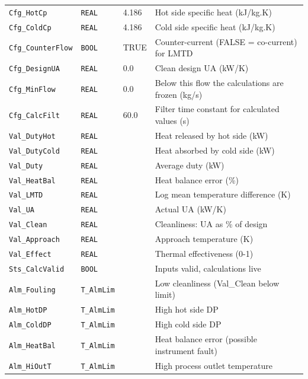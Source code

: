 \begin{small}
\begin{longtable}{@{}P{3.70cm}P{2.20cm}P{1.70cm}P{8.91cm}@{}}
\texttt{Cfg\_HotCp} & \texttt{REAL} & 4.186 & Hot side specific heat (kJ/\allowbreak{}kg.K) \\
\texttt{Cfg\_ColdCp} & \texttt{REAL} & 4.186 & Cold side specific heat (kJ/\allowbreak{}kg.K) \\
\texttt{Cfg\_CounterFlow} & \texttt{BOOL} & TRUE & Counter-current (FALSE = co-current) for LMTD \\
\texttt{Cfg\_DesignUA} & \texttt{REAL} & 0.0 & Clean design UA (kW/\allowbreak{}K) \\
\texttt{Cfg\_MinFlow} & \texttt{REAL} & 0.0 & Below this flow the calculations are frozen (kg/\allowbreak{}s) \\
\texttt{Cfg\_CalcFilt} & \texttt{REAL} & 60.0 & Filter time constant for calculated values (s) \\
\texttt{Val\_DutyHot} & \texttt{REAL} &  & Heat released by hot side (kW) \\
\texttt{Val\_DutyCold} & \texttt{REAL} &  & Heat absorbed by cold side (kW) \\
\texttt{Val\_Duty} & \texttt{REAL} &  & Average duty (kW) \\
\texttt{Val\_HeatBal} & \texttt{REAL} &  & Heat balance error (\%) \\
\texttt{Val\_LMTD} & \texttt{REAL} &  & Log mean temperature difference (K) \\
\texttt{Val\_UA} & \texttt{REAL} &  & Actual UA (kW/\allowbreak{}K) \\
\texttt{Val\_Clean} & \texttt{REAL} &  & Cleanliness: UA as \% of design \\
\texttt{Val\_Approach} & \texttt{REAL} &  & Approach temperature (K) \\
\texttt{Val\_Effect} & \texttt{REAL} &  & Thermal effectiveness (0-1) \\
\texttt{Sts\_CalcValid} & \texttt{BOOL} &  & Inputs valid, calculations live \\
\texttt{Alm\_Fouling} & \texttt{T\_AlmLim} &  & Low cleanliness (Val\_Clean below limit) \\
\texttt{Alm\_HotDP} & \texttt{T\_AlmLim} &  & High hot side DP \\
\texttt{Alm\_ColdDP} & \texttt{T\_AlmLim} &  & High cold side DP \\
\texttt{Alm\_HeatBal} & \texttt{T\_AlmLim} &  & Heat balance error (possible instrument fault) \\
\texttt{Alm\_HiOutT} & \texttt{T\_AlmLim} &  & High process outlet temperature \\
\bottomrule
\end{longtable}
\end{small}

